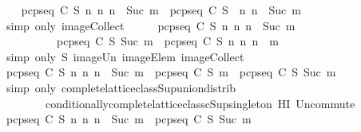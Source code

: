 \begin{isabellebody}
\ \ \isamarkupfalse%
\ {\isachardoublequoteopen}{\isacharbraceleft}pcp{\isacharunderscore}seq\ C\ S\ n\ {\isacharbar}n{\isachardot}\ n\ {\isasymle}\ Suc\ m{\isacharbraceright}\ {\isacharequal}\ {\isacharparenleft}pcp{\isacharunderscore}seq\ C\ S{\isacharparenright}\ {\isacharbackquote}\ {\isacharbraceleft}n{\isachardot}\ n\ {\isasymle}\ Suc\ m{\isacharbraceright}{\isachardoublequoteclose}\ \isanewline
\ \ \ \ \isamarkupfalse%
\ {\isacharparenleft}simp\ only{\isacharcolon}\ image{\isacharunderscore}Collect{\isacharparenright}\isanewline
\ \ \isamarkupfalse%
\ \isamarkupfalse%
\ {\isachardoublequoteopen}{\isasymUnion}{\isacharbraceleft}pcp{\isacharunderscore}seq\ C\ S\ n\ {\isacharbar}n{\isachardot}\ n\ {\isasymle}\ Suc\ m{\isacharbraceright}\ {\isacharequal}\ \isanewline
\ \ \ \ \ \ \ \ \ \ {\isasymUnion}{\isacharparenleft}{\isacharbraceleft}pcp{\isacharunderscore}seq\ C\ S\ {\isacharparenleft}Suc\ m{\isacharparenright}{\isacharbraceright}\ {\isasymunion}\ {\isacharbraceleft}pcp{\isacharunderscore}seq\ C\ S\ n\ {\isacharbar}n{\isachardot}\ n\ {\isasymle}\ m{\isacharbraceright}{\isacharparenright}{\isachardoublequoteclose}\isanewline
\ \ \ \ \isamarkupfalse%
\ {\isacharparenleft}simp\ only{\isacharcolon}\ S\ image{\isacharunderscore}Un\ imageElem\ image{\isacharunderscore}Collect{\isacharparenright}\isanewline
\ \ \isamarkupfalse%
\ \isamarkupfalse%
\ {\isachardoublequoteopen}{\isasymUnion}{\isacharbraceleft}pcp{\isacharunderscore}seq\ C\ S\ n\ {\isacharbar}n{\isachardot}\ n\ {\isasymle}\ Suc\ m{\isacharbraceright}\ {\isacharequal}\ {\isacharparenleft}pcp{\isacharunderscore}seq\ C\ S\ m{\isacharparenright}\ {\isasymunion}\ {\isacharparenleft}pcp{\isacharunderscore}seq\ C\ S\ {\isacharparenleft}Suc\ m{\isacharparenright}{\isacharparenright}{\isachardoublequoteclose}\isanewline
\ \ \ \ \isamarkupfalse%
\ {\isacharparenleft}simp\ only{\isacharcolon}\ complete{\isacharunderscore}lattice{\isacharunderscore}class{\isachardot}Sup{\isacharunderscore}union{\isacharunderscore}distrib\ \isanewline
\ \ \ \ \ \ \ \ conditionally{\isacharunderscore}complete{\isacharunderscore}lattice{\isacharunderscore}class{\isachardot}cSup{\isacharunderscore}singleton\ HI\ Un{\isacharunderscore}commute{\isacharparenright}\isanewline
\ \ \isamarkupfalse%
\ {\isachardoublequoteopen}{\isasymUnion}{\isacharbraceleft}pcp{\isacharunderscore}seq\ C\ S\ n\ {\isacharbar}n{\isachardot}\ n\ {\isasymle}\ Suc\ m{\isacharbraceright}\ {\isacharequal}\ pcp{\isacharunderscore}seq\ C\ S\ {\isacharparenleft}Suc\ m{\isacharparenright}{\isachardoublequoteclose}\isanewline

\end{isabellebody}
